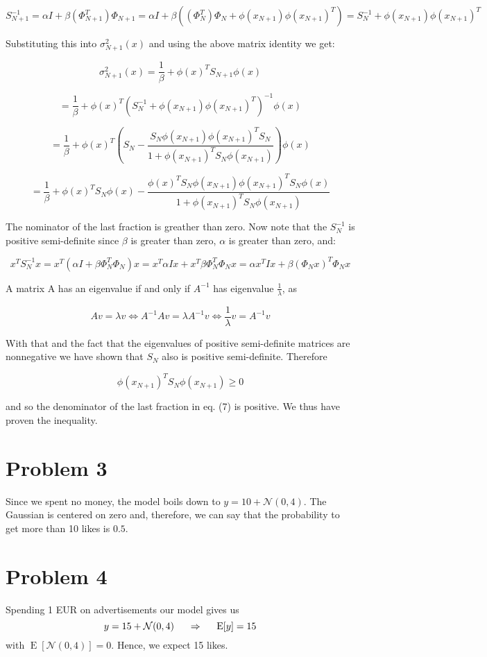 \documentclass[12pt]{article}
\begin{document}
\[
S^{-1}_{N+1} = \alpha I + \beta (\Phi^T_{N+1}) \Phi_{N+1} = \alpha I + \beta ((\Phi^T_{N}) \Phi_N + \phi(x_{N+1}) \phi(x_{N+1})^T) = S^{-1}_{N} + \phi(x_{N+1}) \phi(x_{N+1})^T
\]

Substituting this into $ \sigma^2_{N+1} (x) $ and using the above matrix identity we get:

\[
\sigma^2_{N+1} (x) = \frac{1}{\beta} + \phi(x)^T S_{N+1} \phi(x)
\]

\[
 = \frac{1}{\beta} + \phi(x)^T ({S^{-1}_{N} + \phi(x_{N+1}) \phi(x_{N+1})^T })^{-1} \phi(x)
\]

\[
 = \frac{1}{\beta} + \phi(x)^T (S_{N} - \frac{S_{N} \phi(x_{N+1}) \phi(x_{N+1})^T S_{N}} {1 + \phi(x_{N+1})^T S_{N} \phi(x_{N+1})}) \phi(x) \]

\begin{equation}
 = \frac{1}{\beta} + \phi(x)^T S_{N} \phi(x) - \frac{ \phi(x)^T S_{N} \phi(x_{N+1}) \phi(x_{N+1})^T S_{N} \phi(x)} {1 + \phi(x_{N+1})^T S_{N} \phi(x_{N+1})}
\end{equation}

The nominator of the last fraction is greather than zero. Now note that the $S^{-1}_N$ is positive semi-definite since $\beta$ is greater than zero, $\alpha$ is greater than zero, and:

\[
x^T S^{-1}_{N} x = x^T (\alpha I + \beta \Phi^{T}_{N} \Phi_N  ) x = x^T \alpha I x + x^T \beta \Phi^{T}_{N} \Phi_N x = \alpha x^T I x + \beta (\Phi_N x)^T \Phi_N x
\]

A matrix A has an eigenvalue if and only if $A^{-1}$ has eigenvalue $\frac{1}{\lambda}$, as

\[
Av = \lambda v \Leftrightarrow A^{-1} A v = \lambda A^{-1} v \Leftrightarrow \frac{1}{\lambda} v = A^{-1} v 
\]

With that and the fact that the eigenvalues of positive semi-definite matrices are nonnegative we have shown
that $S_N$ also is positive semi-definite. Therefore

\[
\phi(x_{N+1})^T S_{N} \phi(x_{N+1}) \geq 0
\]

and so the denominator of the last fraction in eq. (7) is positive. We thus have proven the inequality. 

\section*{Problem 3}
Since we spent no money, the model boils down to $y = 10 + \mathcal{N}(0,4)$. The Gaussian is centered on zero and, therefore, we can say that the probability to get more than 10 likes is $0.5$.

\section*{Problem 4}

Spending 1 EUR on advertisements our model gives us 
\begin{equation}
y = 15 + \mathcal{N}(0,4) \hspace{0.5cm} \Rightarrow \hspace{0.5cm} \operatorname{E}[y] = 15
\end{equation}
with \hspace{0.5cm} $\operatorname{E}[\mathcal{N}(0,4)] = 0$. Hence, we expect 15 likes.
\end{document}
